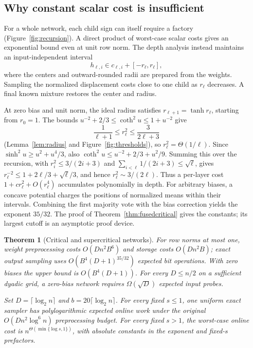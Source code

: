 \documentclass[11pt]{article}
\newtheorem{theorem}{Theorem}[section]
\theoremstyle{definition}
\theoremstyle{remark}
\numberwithin{equation}{section}
\begin{document}
\subsection{Why constant scalar cost is insufficient}


For a whole network, each child sign can itself require a factory
(Figure~\ref{fig:recursion}).
A direct product of worst-case scalar costs gives an exponential
bound even at unit row norm. The depth analysis instead maintains
an input-independent interval
\[
 h_{\ell,i}\in c_{\ell,i}+[-r_\ell,r_\ell],
\]
where the centers and outward-rounded radii are prepared from the
weights. Sampling the normalized displacement costs close to one
child as $r_\ell$ decreases. A final known mixture restores the
center and radius.

At zero bias and unit norm, the ideal radius satisfies
$r_{\ell+1}=\tanh r_\ell$, starting from $r_0=1$. The bounds
$u^{-2}+2/3\le\coth^2u\le1+u^{-2}$ give
\begin{equation}
 \frac1{\ell+1}\le r_\ell^2\le\frac3{2\ell+3}
 \label{eq:main-radius}
\end{equation}
(Lemma~\ref{lem:radius} and Figure~\ref{fig:thresholds}), so
$r_\ell^2=\Theta(1/\ell)$. Since $\sinh^2u\ge u^2+u^4/3$, also
$\coth^2u\le u^{-2}+2/3+u^2/9$. Summing this over the recursion, with
$r_i^2\le3/(2i+3)$ and $\sum_{i<\ell}1/(2i+3)\le\sqrt\ell$, gives
$r_\ell^{-2}\le1+2\ell/3+\sqrt\ell/3$, and hence $r_\ell^2\sim3/(2\ell)$.
Thus a per-layer cost $1+c r_\ell^2+O(r_\ell^4)$ accumulates
polynomially in depth. For arbitrary biases, a concave potential
charges the positions of normalized means within their intervals.
Combining the first majority vote with the bias correction yields
the exponent $35/32$. The proof of Theorem~\ref{thm:fusedcritical}
gives the constants; its largest cutoff is an asymptotic proof device.

\begin{theorem}[Critical and supercritical networks]
\label{thm:main-depth}
For row norms at most one, weight preprocessing costs
$O(Dn^2B^6)$ and storage costs $O(Dn^2B)$; exact output sampling
uses $O(B^4(D+1)^{35/32})$ expected bit operations.
With zero biases the upper bound is $O(B^4(D+1))$.
For every $D\le n/2$ on a sufficient dyadic grid, a zero-bias
network requires $\Omega(\sqrt D)$ expected input probes.

Set $D=\lceil\log_2n\rceil$ and $b=20\lceil\log_2n\rceil$.
For every fixed $s\le1$, one uniform exact sampler has
polylogarithmic expected online work under the original
$O(Dn^2\log^6n)$ preprocessing budget. For every fixed $s>1$,
the worst-case online cost is
$n^{\Theta(\min\{\log s,1\})}$, with absolute constants in the
exponent and fixed-$s$ prefactors.
\end{theorem}
\end{document}
